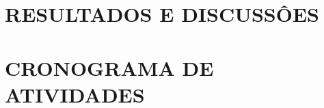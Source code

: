 \renewcommand{\chaptername}{} %
\chapter{RESULTADOS E DISCUSSÔES}
















 
\renewcommand{\chaptername}{} %
\chapter{CRONOGRAMA DE ATIVIDADES}

